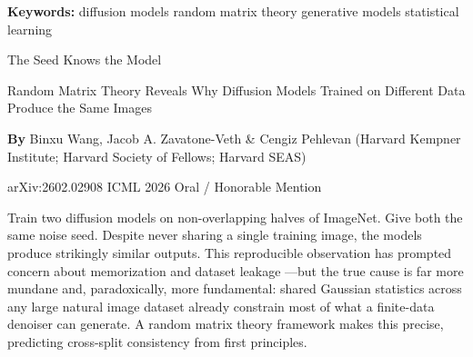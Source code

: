 \documentclass[10pt,twocolumn]{article}
\begin{document}
\setlength{\parindent}{0pt}
\setlength{\parskip}{4pt}

{\small\color{keywordgray}\textbf{Keywords:}
  diffusion models \textbullet{}
  random matrix theory \textbullet{}
  generative models \textbullet{}
  statistical learning}\par\vspace{4pt}

{\LARGE\bfseries\raggedright
  The Seed Knows the Model}\par\vspace{4pt}

{\large\itshape\raggedright
  Random Matrix Theory Reveals Why Diffusion Models
  Trained on Different Data Produce the Same Images}\par\vspace{6pt}

{\small\textbf{By} Binxu Wang, Jacob A. Zavatone-Veth \& Cengiz Pehlevan
  (Harvard Kempner Institute; Harvard Society of Fellows; Harvard SEAS)}\par\vspace{2pt}

{\small\color{keywordgray}arXiv:2602.02908 \textbullet{}
  ICML 2026 Oral / Honorable Mention}
\par\vspace{2pt}\noindent{\color{rulered}\rule{\columnwidth}{0.6pt}}\vspace{6pt}

Train two diffusion models on non-overlapping halves of ImageNet. Give
both the same noise seed. Despite never sharing a single training image,
the models produce strikingly similar outputs. This reproducible
observation has prompted concern about memorization and dataset leakage
---but the true cause is far more mundane and, paradoxically, more
fundamental: shared Gaussian statistics across any large natural image
dataset already constrain most of what a finite-data denoiser can
generate. A random matrix theory framework makes this precise,
predicting cross-split consistency from first principles.
\end{document}
